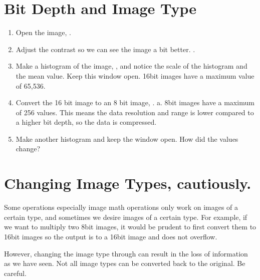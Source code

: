 \documentclass[letterpaper,10pt,english]{jupyterBook}
\begin{document}
\section{Bit Depth and Image Type}
\label{\detokenize{basics:bit-depth-and-image-type}}\begin{enumerate}
%
\item {} 
\sphinxAtStartPar
Open the  image, .

\item {} 
\sphinxAtStartPar
Adjust the contrast so we can see the image a bit better. .

\item {} 
\sphinxAtStartPar
Make a histogram of the image, , and notice the scale of the histogram and the
mean value. Keep this window open. 16\sphinxhyphen{}bit images have a maximum value of 65,536.

\item {} 
\sphinxAtStartPar
Convert the 16 bit image to an 8 bit image, .
a. 8\sphinxhyphen{}bit images have a maximum of 256 values. This means the data resolution and
range is lower compared to a higher bit depth, so the data is compressed.

\item {} 
\sphinxAtStartPar
Make another histogram and keep the window open. How did the values change?

\end{enumerate}

\sphinxAtStartPar
{}


\section{Changing Image Types, cautiously.}
\label{\detokenize{basics:changing-image-types-cautiously}}
\sphinxAtStartPar
Some operations \sphinxhyphen{} especially image math operations \sphinxhyphen{} only work on images of a certain type, and sometimes we desire images of a certain type. For example, if we want to multiply two 8\sphinxhyphen{}bit images, it would be prudent to first convert them to 16\sphinxhyphen{}bit images so the output is to a 16\sphinxhyphen{}bit image and does not overflow.

\sphinxAtStartPar
However, changing the image type through  can result in the loss of information as we have seen. Not all image
types can be converted back to the original. Be careful.
\end{document}
